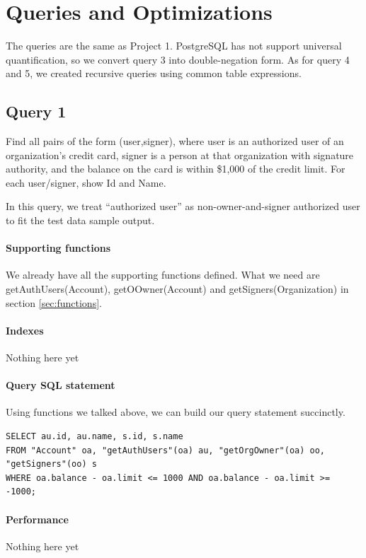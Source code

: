 \documentclass[11pt]{article}
\begin{document}
\section{Queries and Optimizations}
\label{sec:qando}
The queries are the same as Project 1. PostgreSQL has not support universal quantification, so we convert query 3 into double-negation form. As for query 4 and 5, we created recursive queries using common table expressions.

\subsection{Query 1}
Find all pairs of the form (user,signer), where user is an authorized user of an organization's credit card, signer is a person at that organization with signature authority, and the balance on the card is within \$1,000 of the credit limit. For each user/signer, show Id and Name.
\par
In this query, we treat ``authorized user'' as non-owner-and-signer authorized user to fit the test data sample output.

\paragraph{Supporting functions} We already have all the supporting functions defined. What we need are getAuthUsers(Account), getOOwner(Account) and getSigners(Organization) in section \ref{sec:functions}.

\paragraph{Indexes} Nothing here yet

\paragraph{Query SQL statement} Using functions we talked above, we can build our query statement succinctly.
\begin{verbatim}
SELECT au.id, au.name, s.id, s.name
FROM "Account" oa, "getAuthUsers"(oa) au, "getOrgOwner"(oa) oo, "getSigners"(oo) s
WHERE oa.balance - oa.limit <= 1000 AND oa.balance - oa.limit >= -1000;
\end{verbatim}

\paragraph{Performance} Nothing here yet
\end{document}
